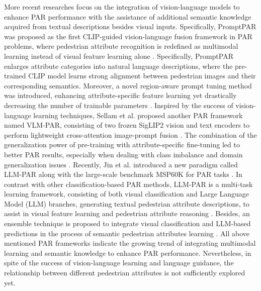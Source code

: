 \documentclass{ieeeaccess}
\begin{document}
More recent researches focus on the integration of vision-language models to enhance PAR performance with the assistance of additional semantic knowledge acquired from textual descriptions besides visual inputs. Specifically, PromptPAR was proposed as the first CLIP-guided vision-language fusion framework in PAR problems, where pedestrian attribute recognition is redefined as multimodal learning instead of visual feature learning alone \cite{bib6}. Specifically, PromptPAR enlarges attribute categories into natural language descriptions, where the pre-trained CLIP model learns strong alignment between pedestrian images and their corresponding semantics. Moreover, a novel region-aware prompt tuning method was introduced, enhancing attribute-specific feature learning yet drastically decreasing the number of trainable parameters \cite{bib6}. Inspired by the success of vision-language learning techniques, Sellam et al. proposed another PAR framework named VLM-PAR, consisting of two frozen SigLIP2 vision and text encoders to perform lightweight cross-attention image-prompt fusion \cite{bib7}. The combination of the generalization power of pre-training with attribute-specific fine-tuning led to better PAR results, especially when dealing with class imbalance and domain generalization issues \cite{bib7}. Recently, Jin et al. introduced a new paradigm called LLM-PAR along with the large-scale benchmark MSP60K for PAR tasks \cite{bib8}. In contrast with other classification-based PAR methods, LLM-PAR is a multi-task learning framework, consisting of both visual classification and Large Language Model (LLM) branches, generating textual pedestrian attribute descriptions, to assist in visual feature learning and pedestrian attribute reasoning \cite{bib8}. Besides, an ensemble technique is proposed to integrate visual classification and LLM-based predictions in the process of semantic pedestrian attributes learning \cite{bib8}. All above mentioned PAR frameworks indicate the growing trend of integrating multimodal learning and semantic knowledge to enhance PAR performance. Nevertheless, in spite of the success of vision-language learning and language guidance, the relationship between different pedestrian attributes is not sufficiently explored yet.
\end{document}
